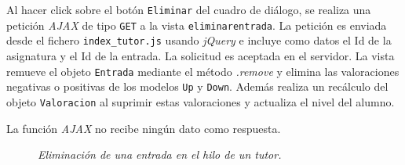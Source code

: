 \documentclass[a4paper, 12pt]{book}
\begin{document}
\begin{itemize}
  Al hacer click sobre el bot\'on \texttt{Eliminar} del cuadro de di\'alogo, se realiza una petici\'on \textit{AJAX} de tipo \texttt{GET} a la vista 
  \texttt{eliminarentrada}. La petici\'on es enviada desde el fichero \texttt{index\_tutor.js} usando \textit{jQuery} e incluye como datos el 
  Id de la asignatura y el Id de la entrada. La solicitud es aceptada en el servidor. La vista remueve el objeto \texttt{Entrada} mediante el m\'etodo 
  \textit{.remove} y elimina las valoraciones negativas o positivas de los modelos \texttt{Up} y \texttt{Down}. Adem\'as realiza un rec\'alculo del objeto 
  \texttt{Valoracion} al suprimir estas valoraciones y actualiza el nivel del alumno.
  
  La funci\'on \textit{AJAX} no recibe ning\'un dato como respuesta.
  
  \begin{figure}
    \centering
    \caption{\textit{Eliminaci\'on de una entrada en el hilo de un tutor.}}
    \label{fig:eliminarentrada}
  \end{figure}


\end{itemize}
\end{document}
